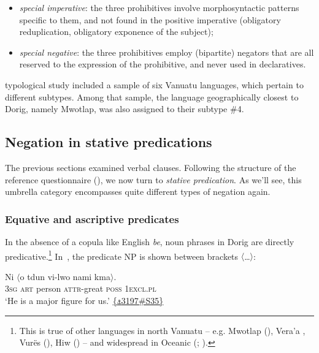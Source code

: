 \documentclass[output=paper,colorlinks,citecolor=brown,draft]{langscibook}
\begin{document}
\begin{itemize}

\item \textit{special imperative}: the three prohibitives involve morphosyntactic patterns specific to them, and not found in the positive imperative (obligatory reduplication, obligatory exponence of the subject);

\item \textit{special negative}: the three prohibitives employ (bipartite) negators that are all reserved to the expression of the prohibitive, and never used in declaratives.

\end{itemize}

\noindent {} typological study included a sample of six Vanua\-tu languages, which pertain to different subtypes. Among that sample, the language geographically closest to Dorig, namely Mwotlap, was also assigned to their subtype \#4.

\subsection{Negation in stative predications}\label{sec:dor:2.3}

The previous sections examined verbal clauses. Following the structure of the reference questionnaire (), we now turn to \textit{stative predication}. As we’ll see, this umbrella category encompasses quite different types of negation again.

\subsubsection{Equative and ascriptive predicates}\label{sec:dor:2.3.1}

In the absence of a copula like English \textit{be}, noun phrases in Dorig are directly predicative.\footnote{This is true of other languages in north Vanuatu – e.g. Mwotlap (\citealt[128]{François2005b}), Vera’a \citep[32]{Schnell2011}, Vurës (\citealt[68]{Malau2016}), Hiw (\citealt[326]{François2017}) – and widespread in Oceanic (\citealt{Lier2016}; \citealt{FrançoisForthcominga}).} In~, the predicate NP is shown between brackets \textrm{${\langle}$}…\textrm{${\rangle}$}:

\ea\label{ex:dor:major} 
    \gll  Ni \textrm{${\langle}$}o tdun vi-lwo nami kma\textrm{${\rangle}$}.\\ 
          \textsc{3sg} \textsc{art} person \textsc{attr-}great \textsc{poss} \textsc{1excl.pl}\\
    \glt ‘He is a major figure for us.’ \quad  \href{https://doi.org/10.24397/pangloss-0003197#S35}{\{\texttt{⚓}3197\#S35\}}
\z 
\end{document}
